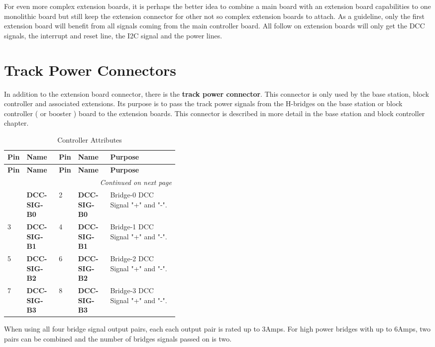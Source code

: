 For even more complex extension boards, it is perhaps the better idea to combine a main board with an extension board capabilities to one monolithic board but still keep the extension connector for other not so complex extension boards to attach. As a guideline, only the first extension board will benefit from all signals coming from the main controller board. All follow on extension boards will only get the DCC signals, the interrupt and reset line, the I2C signal and the power lines.

\section{Track Power Connectors}

In addition to the extension board connector, there is the \textbf{track power connector}. This connector is only used by the base station, block controller and associated extensions. Its purpose is to pass the track power signals from the H-bridges on the base station or block controller ( or booster ) board to the extension boards. This connector is described in more detail in the base station and block controller chapter.

\begin{longtable}{@{}|l|l|l|l|p{0.4\linewidth}|@{}}
    \caption{Controller Attributes} \\
    \toprule
    \textbf{Pin} & \textbf{Name} & \textbf{Pin} & \textbf{Name} & \textbf{Purpose} \\
    \midrule
    \endfirsthead
    \toprule
    \textbf{Pin} & \textbf{Name} & \textbf{Pin} & \textbf{Name} & \textbf{Purpose} \\
    \midrule
    \endhead
    \midrule
    \multicolumn{5}{r}{\textit{Continued on next page}} \\
    \midrule
    \endfoot
    \bottomrule
    \endlastfoot
    1 & \textbf{DCC-SIG-B0} & 2 & \textbf{DCC-SIG-B0} & Bridge-0 DCC Signal "+" and "-". \\
    \midrule
    3 & \textbf{DCC-SIG-B1} & 4 & \textbf{DCC-SIG-B1} & Bridge-1 DCC Signal "+" and "-". \\
    \midrule
    5 & \textbf{DCC-SIG-B2} & 6 & \textbf{DCC-SIG-B2} & Bridge-2 DCC Signal "+" and "-". \\
    \midrule
    7 & \textbf{DCC-SIG-B3} & 8 & \textbf{DCC-SIG-B3} & Bridge-3 DCC Signal "+" and "-". \\
\end{longtable}%

When using all four bridge signal output pairs, each each output pair is rated up to 3Amps. For high power bridges with up to 6Amps, two pairs can be combined and the number of bridges signals passed on is two.


